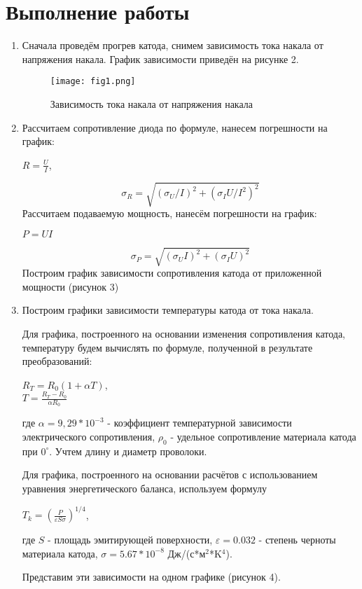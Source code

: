 \documentclass[a4paper]{article}
\begin{document}
\section{Выполнение работы}
\begin{enumerate}
    \item Сначала проведём прогрев катода, снимем зависимость тока накала от напряжения накала. График зависимости приведён на рисунке 2.

\begin{figure}[h]
\begin{center}
\texttt{[image: fig1.png]}
\caption{Зависимость тока накала от напряжения накала}
\end{center}
\end{figure}
   
\item Рассчитаем сопротивление диода по формуле, нанесем погрешности на график:
\begin{center}
    $R = \frac{U}{I}$,
\end{center}
$$\sigma_R = \sqrt{(\sigma_U / I)^2 +(\sigma_I U/I^2)^2}$$
Рассчитаем подаваемую мощность, нанесём погрешности на график:
\begin{center}
    $P = U I$
\end{center}
$$\sigma_P = \sqrt{(\sigma_U I)^2 +(\sigma_I U)^2}$$
Построим график зависимости сопротивления катода от приложенной мощности (рисунок 3)



\item Построим графики зависимости температуры катода от тока накала.  \par
Для графика, построенного на основании изменения сопротивления катода, температуру будем вычислять по формуле, полученной в результате преобразований:
\begin{center}
   $ R_T = R_0 (1 + \alpha T) $, \\
   $T = \frac{R_T - R_0 }{\alpha R_0}$
\end{center}
где $\alpha = 9,29 * 10^{-3}$ - коэффициент температурной зависимости электрического сопротивления, $\rho_0$ - удельное сопротивление материала катода при $0^{\circ}$. Учтем длину и диаметр проволоки. \par

Для графика, построенного на основании расчётов с использованием уравнения энергетического баланса, используем формулу 
\begin{center}
    $T_k = (\frac{P}{\varepsilon S \sigma})^{1/4}$,
\end{center}
где $S$ - площадь эмитирующей поверхности, $\varepsilon = 0.032$ - степень черноты материала катода, $\sigma = 5.67*10^{-8}$ Дж/(с*м$^2$*K$^4$). \par
Представим эти зависимости на одном графике (рисунок 4).





\end{enumerate}
\end{document}
